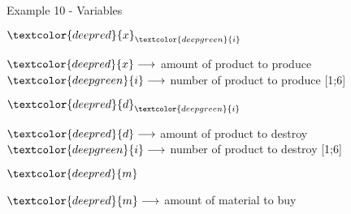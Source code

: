 \begin{frame}{Example 10 - Variables}
\begin{multicols}{3}

\begin{center}
\Huge{
$\textcolor{deepred}{x}_{\textcolor{deepgreen}{i}}$
}
\end{center}
\normalsize{
$\textcolor{deepred}  {x} \longrightarrow$
    amount of product to produce  \\
$\textcolor{deepgreen}{i} \longrightarrow$
    number of product to produce [1;6]
}
\vfill
\columnbreak


\begin{center}
\Huge{
$\textcolor{deepred}{d}_{\textcolor{deepgreen}{i}}$
}
\end{center}
\normalsize{
$\textcolor{deepred}  {d} \longrightarrow$
    amount of product to destroy  \\
$\textcolor{deepgreen}{i} \longrightarrow$
    number of product to destroy [1;6]
}
\vfill
\columnbreak


\begin{center}
\Huge{
$\textcolor{deepred}{m}$
}
\end{center}
\normalsize{
$\textcolor{deepred}  {m} \longrightarrow$
    amount of material to buy
}

\end{multicols}
\end{frame}
